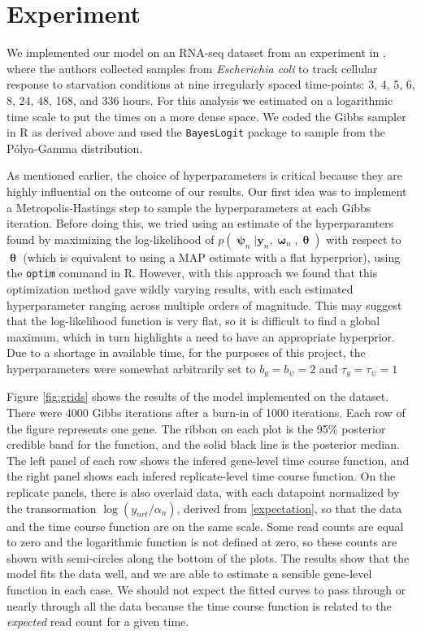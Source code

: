 \documentclass[11pt]{article}
\newcommand{\1}{\mathbf{1}}
\newcommand{\0}{\mathbf{0}}
\newcommand{\y}{\mathbf{y}}
\begin{document}

\section{Experiment}\label{Experiment}

We implemented our model on an RNA-seq dataset from an experiment in \cite{Houser}, where the authors collected samples from \emph{Escherichia coli} to track cellular response to starvation conditions at nine irregularly spaced time-points: 3, 4, 5, 6, 8, 24, 48, 168, and 336 hours. For this analysis we estimated on a logarithmic time scale to put the times on a more dense space. We coded the Gibbs sampler in \textsf{R} as derived above and used the \texttt{BayesLogit} package \cite{PG} to sample from the P\'{o}lya-Gamma distribution.

As mentioned earlier, the choice of hyperparameters is critical because they are highly influential on the outcome of our results. Our first idea was to implement a Metropolis-Hastings step to sample the hyperparameters at each Gibbs iteration. Before doing this, we tried using an estimate of the hyperparamters found by maximizing the log-likelihood of $p(\bm{\uppsi}_{n} | \y_{n}, \bm{\upomega}_{n}, \bm{\uptheta})$ with respect to $\bm{\uptheta}$ (which is equivalent to using a MAP estimate with a flat hyperprior), using the \texttt{optim} command in \textsf{R}. However, with this approach we found that this optimization method gave wildly varying results, with each estimated hyperparameter ranging across multiple orders of magnitude. This may suggest that the log-likelihood function is very flat, so it is difficult to find a global maximum, which in turn highlights a need to have an appropriate hyperprior. Due to a shortage in available time, for the purposes of this project, the hyperparameters were somewhat arbitrarily set to $b_g = b_\psi = 2$ and $\tau_g = \tau_\psi = 1$ 

Figure \ref{fig:grids} shows the results of the model implemented on the dataset. There were 4000 Gibbs iterations after a burn-in of 1000 iterations. Each row of the figure represents one gene. The ribbon on each plot is the 95\% posterior credible band for the function, and the solid black line is the posterior median. The left panel of each row shows the infered gene-level time course function, and the right panel shows each infered replicate-level time course function. On the replicate panels, there is also overlaid data, with each datapoint normalized by the transormation $\log(y_{nrt} / \alpha_n)$, derived from \ref{expectation}, so that the data and the time course function are on the same scale. Some read counts are equal to zero and the logarithmic function is not defined at zero, so these counts are shown with semi-circles along the bottom of the plots. The results show that the model fits the data well, and we are able to estimate a sensible gene-level function in each case. We should not expect the fitted curves to pass through or nearly through all the data because the time course function is related to the \emph{expected} read count for a given time.
\end{document}
